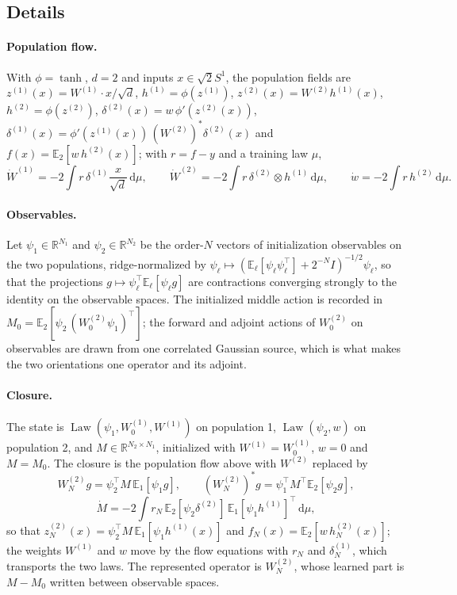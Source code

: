 \documentclass[11pt]{article}
\theoremstyle{definition}
\theoremstyle{remark}
\newcommand{\R}{\mathbb{R}}
\newcommand{\E}{\mathbb{E}}
\newcommand{\dd}{\,\mathrm{d}}
\newcommand{\Law}{\operatorname{Law}}
\begin{document}
\subsection*{Details}

\paragraph{Population flow.}
With $\phi=\tanh$, $d=2$ and inputs $x\in\sqrt2S^1$, the population fields are
$z^{(1)}(x)=W^{(1)}\cdot x/\sqrt d$, $h^{(1)}=\phi(z^{(1)})$,
$z^{(2)}(x)=W^{(2)}h^{(1)}(x)$, $h^{(2)}=\phi(z^{(2)})$,
$\delta^{(2)}(x)=w\,\phi'(z^{(2)}(x))$,
$\delta^{(1)}(x)=\phi'(z^{(1)}(x))\,(W^{(2)})^*\delta^{(2)}(x)$ and
$f(x)=\E_2[w\,h^{(2)}(x)]$; with $r=f-y$ and a training law $\mu$,
\[
 \dot W^{(1)}=-2\!\int\! r\,\delta^{(1)}\frac{x}{\sqrt d}\dd\mu,\qquad
 \dot W^{(2)}=-2\!\int\! r\,\delta^{(2)}\otimes h^{(1)}\dd\mu,\qquad
 \dot w=-2\!\int\! r\,h^{(2)}\dd\mu .
\]

\paragraph{Observables.}
Let $\psi_1\in\R^{N_1}$ and $\psi_2\in\R^{N_2}$ be the order-$N$ vectors of
initialization observables on the two populations, ridge-normalized by
$\psi_\ell\mapsto(\E_\ell[\psi_\ell\psi_\ell^\top]+2^{-N}I)^{-1/2}\psi_\ell$, so
that the projections $g\mapsto\psi_\ell^\top\E_\ell[\psi_\ell g]$ are contractions
converging strongly to the identity on the observable spaces.  The initialized
middle action is recorded in $M_0=\E_2[\psi_2\,(W_0^{(2)}\psi_1)^\top]$; the
forward and adjoint actions of $W_0^{(2)}$ on observables are drawn from one
correlated Gaussian source, which is what makes the two orientations one
operator and its adjoint.

\paragraph{Closure.}
The state is $\Law(\psi_1,W^{(1)}_0,W^{(1)})$ on population 1,
$\Law(\psi_2,w)$ on population 2, and $M\in\R^{N_2\times N_1}$, initialized with
$W^{(1)}=W^{(1)}_0$, $w=0$ and $M=M_0$.  The closure is the population flow above
with $W^{(2)}$ replaced by
\[
 W^{(2)}_Ng=\psi_2^\top M\,\E_1[\psi_1g],\qquad
 (W^{(2)}_N)^*g=\psi_1^\top M^\top\E_2[\psi_2g],
\]
\[
 \dot M=-2\!\int\! r_N\,\E_2[\psi_2\delta^{(2)}]\,\E_1[\psi_1h^{(1)}]^\top\dd\mu,
\]
so that $z^{(2)}_N(x)=\psi_2^\top M\,\E_1[\psi_1h^{(1)}(x)]$ and
$f_N(x)=\E_2[w\,h^{(2)}_N(x)]$; the weights $W^{(1)}$ and $w$ move by the flow
equations with $r_N$ and $\delta^{(1)}_N$, which transports the two laws.  The
represented operator is $W^{(2)}_N$, whose learned part is $M-M_0$ written
between observable spaces.
\end{document}
